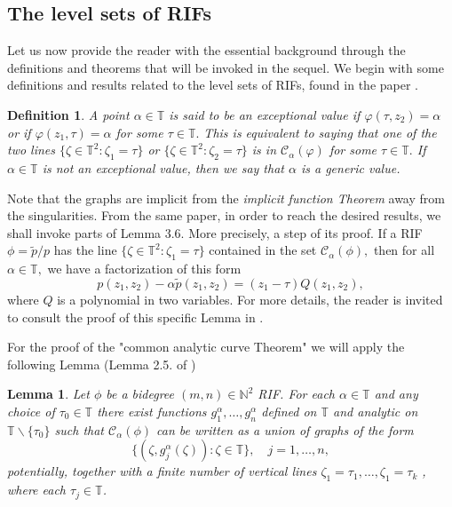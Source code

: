 \documentclass[12pt]{amsart}
\newtheorem{lemma}[theorem]{Lemma}
\newtheorem{definition}[theorem]{Definition}
\numberwithin{equation}{section}
\begin{document}
\subsection{The level sets of RIFs}
Let us now provide the reader with the essential background through the definitions and theorems that will be invoked in the sequel. We begin with some definitions and results related to the level sets of RIFs, found in the paper \cite{Clark}.
\begin{definition} A point $\alpha\in\mathbb{T}$ is said to be an \textit{exceptional value} if $\varphi(\tau, z_2)=\alpha$ or if $\varphi(z_1,\tau) = \alpha$ for some $\tau\in\mathbb{T}.$ This is equivalent to saying that one of the two lines $\{\zeta \in \mathbb{T}^2: \zeta_1 = \tau\}$ or $\{\zeta \in \mathbb{T}^2: \zeta_2 = \tau\}$ is in $\mathcal{C}_{\alpha}(\varphi)$ for some $\tau\in\mathbb{T}.$ If $\alpha \in \mathbb{T}$ is not an
exceptional value, then we say that $\alpha$ is a generic value.
\end{definition}
Note that the graphs are implicit from the \textit{implicit function Theorem} away from the singularities. From the same paper, in order to reach the desired results, we shall invoke parts of Lemma 3.6. More precisely, a step of its proof. If a RIF $\phi=\widetilde{p}/p$ has the line $\{\zeta\in\mathbb{T}^2:\zeta_1=\tau\}$ contained in the set $\mathcal{C}_{\alpha}(\phi),$ then for all $\alpha\in\mathbb{T},$ we have a factorization of this form
$$p(z_1,z_2)-\alpha \widetilde{p}(z_1,z_2)=(z_1-\tau)Q(z_1,z_2),$$
where $Q$ is a polynomial in two variables. For more details, the reader is invited to consult the proof of this specific Lemma in \cite{Clark}.

For the proof of the "common analytic curve Theorem" we will apply the following Lemma (Lemma 2.5. of \cite{Clark})

\begin{lemma} \label{parametrization}
Let $\phi$ be a bidegree $(m,n)\in\mathbb{N}^2$ RIF. For each $\alpha \in \mathbb{T}$ and any choice of $\tau_0\in \mathbb{T}$ there exist functions $g_{1}^{\alpha},\ldots ,g_{n}^{\alpha}$ defined on $\mathbb{T}$ and analytic on $\mathbb{T}\backslash \{\tau_0\}$ such that $\mathcal{C}_{\alpha}(\phi)$ can be written as a union of graphs of the form
$$\{(\zeta ,g_{j}^{\alpha}(\zeta)):\zeta \in \mathbb{T}\} ,\quad j = 1,\ldots ,n,$$
potentially, together with a finite number of vertical lines $\zeta_{1} = \tau_{1},\ldots ,\zeta_{1} = \tau_{k}$ , where each $\tau_{j}\in \mathbb{T}$.
\end{lemma}
\end{document}
